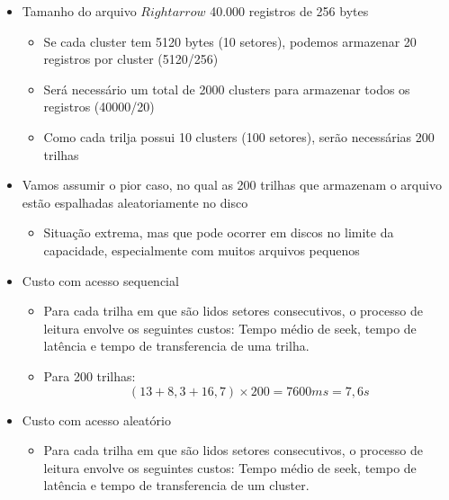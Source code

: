 \documentclass[12pt]{article}
\begin{document}
\begin{itemize}
\begin{itemize}
\begin{itemize}
\begin{table}[H]
                \end{table}
                \item Tamanho do arquivo $Rightarrow$ 40.000 registros de 256 
                bytes
                \begin{itemize}
                    \item Se cada cluster tem 5120 bytes (10 setores), podemos 
                    armazenar 20 registros por cluster (5120/256)
                    \item Será necessário um total de 2000 clusters para 
                    armazenar todos os registros (40000/20)
                    \item Como cada trilja possui 10 clusters (100 setores), 
                    serão necessárias 200 trilhas
                \end{itemize}
                \item Vamos assumir o pior caso, no qual as 200 trilhas que 
                armazenam o arquivo estão espalhadas aleatoriamente no disco
                \begin{itemize}
                    \item Situação extrema, mas que pode ocorrer em discos no 
                    limite da capacidade, especialmente com muitos arquivos 
                    pequenos
                \end{itemize}
                \item Custo com acesso sequencial
                \begin{itemize}
                    \item Para cada trilha em que são lidos setores consecutivos, 
                    o processo de leitura envolve os seguintes custos: Tempo 
                    médio de seek, tempo de latência e tempo de transferencia de 
                    uma trilha.
                    \item Para 200 trilhas: 
                    \[(13 + 8,3 + 16,7) \times 200 = 7600ms = 7,6s\]
                \end{itemize}
                \item Custo com acesso aleatório
                \begin{itemize}
                    \item Para cada trilha em que são lidos setores consecutivos, 
                    o processo de leitura envolve os seguintes custos: Tempo 
                    médio de seek, tempo de latência e tempo de transferencia de 
                    um cluster.
                \end{itemize}
            \end{itemize}
        \end{itemize}
    \end{itemize}
    
\end{document}
